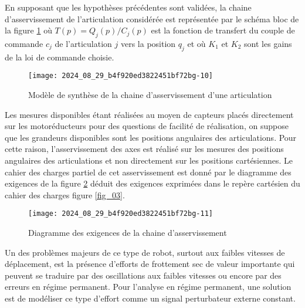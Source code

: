 En supposant que les hypothèses précédentes sont validées, la chaine d'asservissement de l'articulation considérée est représentée par le schéma bloc de la figure \ref{fig_11} où $T(p)=Q_{j}(p) / C_{j}(p)$ est la fonction de transfert du couple de commande $c_{j}$ de l'articulation $j$ vers la position $q_{j}$ et où $K_{1}$ et $K_{2}$ sont les gains de la loi de commande choisie.

\begin{figure}[!h]
\centering
\texttt{[image: 2024\_08\_29\_b4f920ed3822451bf72bg-10]}
\caption{\label{fig_11}Modèle de synthèse de la chaine d'asservissement d'une articulation}
\end{figure}

Les mesures disponibles étant réalisées au moyen de capteurs placés directement sur les motoréducteurs pour des questions de facilité de réalisation, on suppose que les grandeurs disponibles sont les positions angulaires des articulations. Pour cette raison, l'asservissement des axes est réalisé sur les mesures des positions angulaires des articulations et non directement sur les positions cartésiennes. Le cahier des charges partiel de cet asservissement est donné par le diagramme des exigences de la figure \ref{fig_12} déduit des exigences exprimées dans le repère cartésien du cahier des charges figure \ref{fig_03}.

\begin{figure}[!h]
\centering
\texttt{[image: 2024\_08\_29\_b4f920ed3822451bf72bg-11]}
\caption{\label{fig_12}Diagramme des exigences de la chaine d'asservissement}
\end{figure}


Un des problèmes majeurs de ce type de robot, surtout aux faibles vitesses de déplacement, est la présence d'efforts de frottement sec de valeur importante qui peuvent se traduire par des oscillations aux faibles vitesses ou encore par des erreurs en régime permanent. Pour l'analyse en régime permanent, une solution est de modéliser ce type d'effort comme un signal perturbateur externe constant.\\

